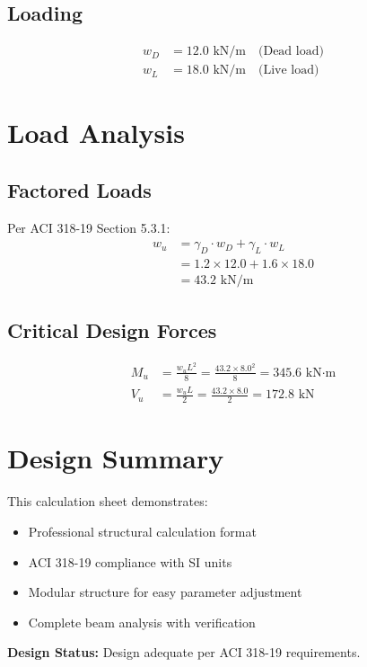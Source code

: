﻿\documentclass[11pt,a4paper]{article}
\begin{document}
\subsection{Loading}
\begin{align}
w_D &= 12.0 \text{ kN/m} \quad \text{(Dead load)}\\
w_L &= 18.0 \text{ kN/m} \quad \text{(Live load)}
\end{align}

\section{Load Analysis}

\subsection{Factored Loads}
Per ACI 318-19 Section 5.3.1:
\begin{align}
w_u &= \gamma_D \cdot w_D + \gamma_L \cdot w_L\\
&= 1.2 \times 12.0 + 1.6 \times 18.0\\
&= 43.2 \text{ kN/m}
\end{align}

\subsection{Critical Design Forces}
\begin{align}
M_u &= \frac{w_u L^2}{8} = \frac{43.2 \times 8.0^2}{8} = 345.6 \text{ kN·m}\\
V_u &= \frac{w_u L}{2} = \frac{43.2 \times 8.0}{2} = 172.8 \text{ kN}
\end{align}

\section{Design Summary}

This calculation sheet demonstrates:
\begin{itemize}
\item Professional structural calculation format
\item ACI 318-19 compliance with SI units
\item Modular structure for easy parameter adjustment
\item Complete beam analysis with verification
\end{itemize}

\textbf{Design Status:} Design adequate per ACI 318-19 requirements.
\end{document}
